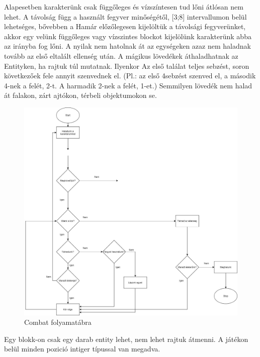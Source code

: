 Alapesetben karakterünk csak függőleges és vízszíntesen tud lőni átlósan nem lehet. A távolság függ a használt fegyver minőségétől, [3;8] intervallumon belül lehetséges, bővebben a %
Hamár előzőlegesen kijelöltük a távolsági fegyverünket, akkor egy velünk függőleges vagy vízszintes blockot kijelölünk karakterünk abba az irányba fog lőni.
A nyilak nem hatolnak át az egységeken azaz nem haladnak tovább az első eltalált ellenség után.
A mágikus lövedékek áthaladhatnak az Entityken, ha rajtuk túl mutatnak. Ilyenkor Az első találat teljes sebzést, soron következőek fele annyit szenvednek el. (Pl.: az első 4sebzést szenved el, a második 4-nek a felét, 2-t. A harmadik 2-nek a felét, 1-et.)
Semmilyen lövedék nem halad át falakon, zárt ajtókon, térbeli objektumokon se.


\begin{figure}[h!]
	\centering
	\includegraphics[width=\textwidth]{images/image5.png}
	\caption{Combat folyamatábra}
	\label{fig:combat2}
\end{figure}


Egy blokk-on csak egy darab entity lehet, nem lehet rajtuk átmenni.
A játékon belül minden pozició intiger típussal van megadva.

